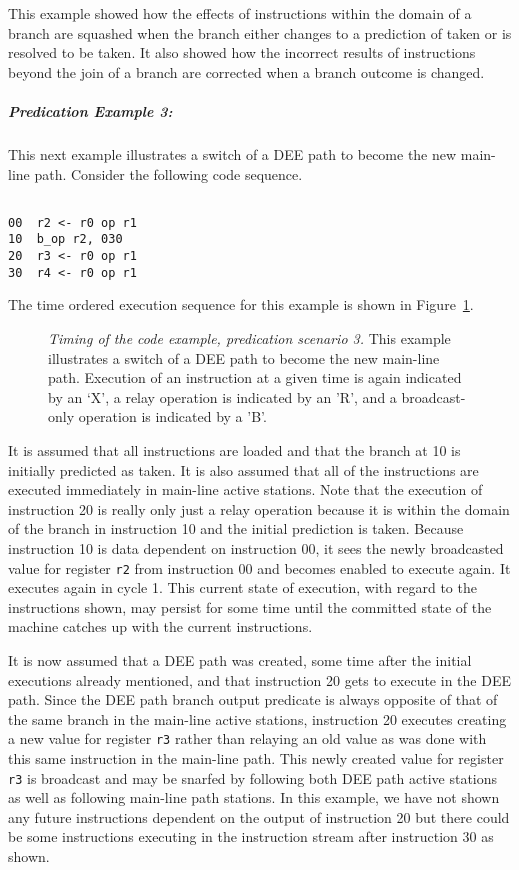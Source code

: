 This example showed how the effects of instructions within the
domain of a branch are squashed when the branch either
changes to a prediction of taken or is resolved to be taken.
It also showed how the incorrect results of instructions beyond the
join of a branch are corrected when a branch outcome is changed.

\subparagraph{Predication Example 3: }
This next example illustrates a switch of a DEE path to become
the new main-line path.
Consider the following code sequence.

\begin{verbatim}

00	r2 <- r0 op r1
10	b_op r2, 030
20	r3 <- r0 op r1
30	r4 <- r0 op r1

\end{verbatim}

The time ordered execution sequence for this example is shown in
Figure~\ref{pex3}.

\begin{figure}
\centering
{}
\caption{{\em Timing of the code example, predication scenario 3.}
This example illustrates a switch of a DEE path to
become the new main-line path.
Execution of an instruction at a given time is
again indicated by an `X', a relay operation is indicated by an 'R',
and a broadcast-only operation is indicated by a 'B'.}
\label{pex3}
\end{figure}

It is assumed that all instructions are loaded and that
the branch at 10 is initially predicted as taken.
It is also assumed that all of the instructions are
executed immediately in main-line active stations.
Note that the execution of instruction 20 is really only
just a relay operation because it is within the domain of the branch 
in instruction 10 and the initial prediction is taken.
Because instruction 10 is data dependent on instruction 00, it
sees the newly broadcasted value
for register
{\tt r2}
from instruction 00 and becomes enabled to execute again.
It executes again in cycle 1.
This current state of execution, with regard to the instructions
shown, may persist for some time until the committed state of
the machine catches up with the current instructions.

It is now assumed that a DEE path was created, some time
after the initial executions already mentioned, and that
instruction 20 gets to execute in the DEE path.  Since
the DEE path branch output predicate is always opposite of
that of the same branch in the main-line active stations,
instruction 20 executes creating a new value for
register
{\tt r3}
rather than relaying an old value as was done with this
same instruction in the main-line path.
This newly created value for register
{\tt r3}
is broadcast and may be snarfed by following both DEE path
active stations as well as following main-line path stations.
In this example, we have not shown any future instructions
dependent on the output of instruction 20 but there could be
some instructions executing in the instruction stream after instruction 30
as shown.

